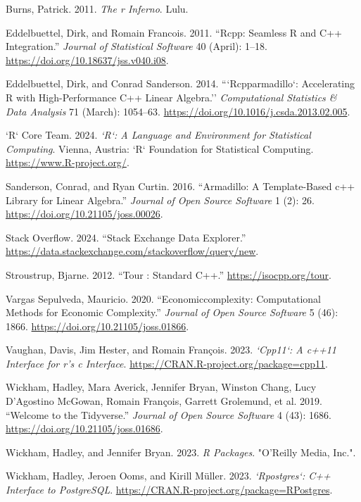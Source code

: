 \documentclass[preprint,12pt]{elsarticle}
\newlength{\cslhangindent}
\newenvironment{CSLReferences}[2] %
 {\begin{list}{}{%
  \setlength{\itemindent}{0pt}
  \setlength{\leftmargin}{0pt}
  \setlength{\parsep}{0pt}
  \ifodd #1
   \setlength{\leftmargin}{\cslhangindent}
   \setlength{\itemindent}{-1\cslhangindent}
  \fi
  \setlength{\itemsep}{#2\baselineskip}}}
 {\end{list}}
\begin{document}
\label{refs}
\begin{CSLReferences}{1}{0}
Burns, Patrick. 2011. \emph{The r Inferno}. Lulu.

Eddelbuettel, Dirk, and Romain Francois. 2011. {``Rcpp: {Seamless} {R}
and {C}++ {Integration}.''} \emph{Journal of Statistical Software} 40
(April): 1--18. \url{https://doi.org/10.18637/jss.v040.i08}.

Eddelbuettel, Dirk, and Conrad Sanderson. 2014. {```Rcpparmadillo`:
{Accelerating} {R} with High-Performance {C}++ Linear Algebra.''}
\emph{Computational Statistics \& Data Analysis} 71 (March): 1054--63.
\url{https://doi.org/10.1016/j.csda.2013.02.005}.

`R` Core Team. 2024. \emph{`R`: A Language and Environment for
Statistical Computing}. Vienna, Austria: `R` Foundation for Statistical
Computing. \url{https://www.R-project.org/}.

Sanderson, Conrad, and Ryan Curtin. 2016. {``Armadillo: A Template-Based
c++ Library for Linear Algebra.''} \emph{Journal of Open Source
Software} 1 (2): 26. \url{https://doi.org/10.21105/joss.00026}.

Stack Overflow. 2024. {``{Stack} {Exchange} {Data} {Explorer}.''}
\url{https://data.stackexchange.com/stackoverflow/query/new}.

Stroustrup, Bjarne. 2012. {``Tour : {Standard} {C}++.''}
\url{https://isocpp.org/tour}.

Vargas Sepulveda, Mauricio. 2020. {``Economiccomplexity: {Computational}
{Methods} for {Economic} {Complexity}.''} \emph{Journal of Open Source
Software} 5 (46): 1866. \url{https://doi.org/10.21105/joss.01866}.

Vaughan, Davis, Jim Hester, and Romain François. 2023. \emph{`Cpp11`: A
c++11 Interface for r's c Interface}.
\url{https://CRAN.R-project.org/package=cpp11}.

Wickham, Hadley, Mara Averick, Jennifer Bryan, Winston Chang, Lucy
D'Agostino McGowan, Romain François, Garrett Grolemund, et al. 2019.
{``Welcome to the Tidyverse.''} \emph{Journal of Open Source Software} 4
(43): 1686. \url{https://doi.org/10.21105/joss.01686}.

Wickham, Hadley, and Jennifer Bryan. 2023. \emph{R Packages}. "O'Reilly
Media, Inc.".

Wickham, Hadley, Jeroen Ooms, and Kirill Müller. 2023.
\emph{`Rpostgres`: C++ Interface to PostgreSQL}.
\url{https://CRAN.R-project.org/package=RPostgres}.

\end{CSLReferences}

 

\end{document}
